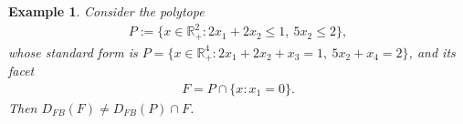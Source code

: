\documentclass{article}
\newtheorem{example}{Example}
\newcommand{\R}{\mathbb{R}}
\begin{document}



\begin{example} \label{ex:dantzig-feasible}
    Consider the polytope
    \begin{align}
        P := \{x \in \R_+^2 : 2x_1 + 2x_2 \leq 1, \ 5x_2 \leq 2\},
    \end{align}
    whose standard form is $P = \{x \in \R_+^4 : 2x_1 + 2x_2 + x_3 = 1, \ 5x_2 + x_4 = 2\}$, and its facet
    \begin{align}
        F = P \cap \{x : x_1 = 0\}.
    \end{align}
    Then $D_{FB}(F) \neq D_{FB}(P) \cap F$.
\end{example}
\end{document}
